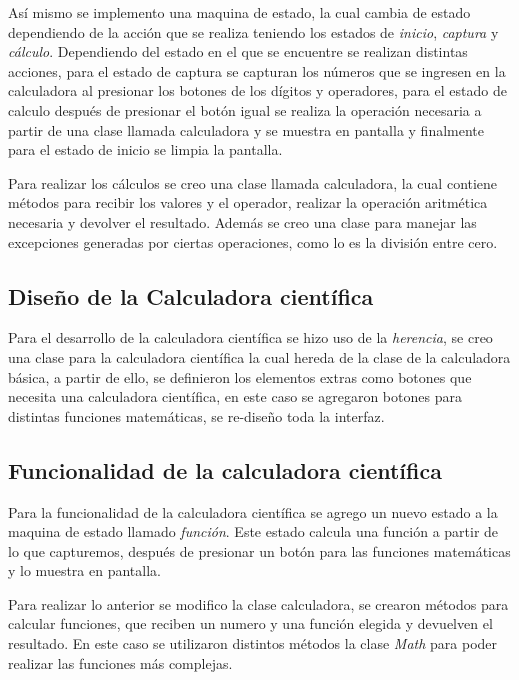 \documentclass[]{article}
\begin{document}
Así mismo se implemento una maquina de estado, la cual cambia de estado dependiendo de la acción que se realiza teniendo los estados de \textit{inicio}, \textit{captura} y \textit{cálculo}. Dependiendo del estado en el que se encuentre se realizan distintas acciones, para el estado de captura se capturan los números que se ingresen en la calculadora al presionar los botones de los dígitos y operadores, para el estado de calculo después de presionar el botón igual se realiza la operación necesaria a partir de una clase llamada calculadora y se muestra en pantalla y finalmente para el estado de inicio se limpia la pantalla.

Para realizar los cálculos se creo una clase llamada calculadora, la cual contiene métodos para recibir los valores y el operador, realizar la operación aritmética necesaria y devolver el resultado. Además se creo una clase para manejar las excepciones generadas por ciertas operaciones, como lo es la división entre cero.

\subsection{Diseño de la Calculadora científica}

Para el desarrollo de la calculadora científica se hizo uso de la \textit{herencia}, se creo una clase para la calculadora científica la cual hereda de la clase de la calculadora básica, a partir de ello, se definieron los elementos extras como botones que necesita una calculadora científica, en este caso se agregaron botones para distintas funciones matemáticas, se re-diseño toda la interfaz.

\subsection{Funcionalidad de la calculadora científica}

Para la funcionalidad de la calculadora científica se agrego un nuevo estado a la maquina de estado llamado \textit{función}. Este estado calcula una función a partir de lo que capturemos, después de presionar un botón para las funciones matemáticas y lo muestra en pantalla.

Para realizar lo anterior se modifico la clase calculadora, se crearon métodos para calcular funciones, que reciben un numero y una función elegida y devuelven el resultado. En este caso se utilizaron distintos métodos la clase \textit{Math} para poder realizar las funciones más complejas.
\end{document}
